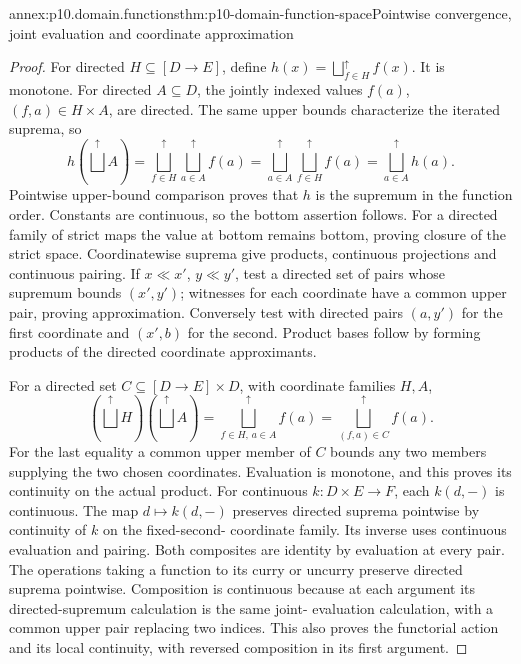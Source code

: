\begin{annexitem}{annex:p10.domain.functions}{thm:p10-domain-function-space}{Pointwise convergence, joint evaluation and coordinate approximation}
\begin{proof}
For directed \(H\subseteq[D\longrightarrow E]\), define
\(h(x)=\bigsqcup^{\uparrow}_{f\in H}f(x)\). It is monotone.
For directed \(A\subseteq D\), the jointly indexed values
\(f(a)\), \((f,a)\in H\times A\), are directed. The same
upper bounds characterize the iterated suprema, so
\[
 h(\bigsqcup^{\uparrow}A)
 =\bigsqcup_{f\in H}^{\uparrow}\bigsqcup_{a\in A}^{\uparrow}f(a)
 =\bigsqcup_{a\in A}^{\uparrow}\bigsqcup_{f\in H}^{\uparrow}f(a)
 =\bigsqcup_{a\in A}^{\uparrow}h(a).
\]
Pointwise upper-bound comparison proves that \(h\) is the supremum
in the function order. Constants are continuous, so the bottom
assertion follows. For a directed family of strict maps the value
at bottom remains bottom, proving closure of the strict space.
Coordinatewise suprema give products, continuous projections and
continuous pairing. If \(x\ll x'\), \(y\ll y'\), test a directed
set of pairs whose supremum bounds \((x',y')\); witnesses for each
coordinate have a common upper pair, proving approximation.
Conversely test with directed pairs \((a,y')\) for the first
coordinate and \((x',b)\) for the second. Product bases follow by
forming products of the directed coordinate approximants.

For a directed set \(C\subseteq[D\longrightarrow E]\times D\),
with coordinate families \(H,A\),
\[
 (\bigsqcup^{\uparrow}H)(\bigsqcup^{\uparrow}A)
          =\bigsqcup_{f\in H,\,a\in A}^{\uparrow} f(a)
          =\bigsqcup_{(f,a)\in C}^{\uparrow} f(a).
\]
For the last equality a common upper member of \(C\) bounds any
two members supplying the two chosen coordinates. Evaluation is
monotone, and this proves its continuity on the actual product.
For continuous \(k:D\times E\to F\), each \(k(d,-)\) is
continuous. The map \(d\mapsto k(d,-)\) preserves directed
suprema pointwise by continuity of \(k\) on the fixed-second-
coordinate family. Its inverse uses continuous evaluation and
pairing. Both composites are identity by evaluation at every pair.
The operations taking a function to its curry or uncurry preserve
directed suprema pointwise. Composition is continuous because at
each argument its directed-supremum calculation is the same joint-
evaluation calculation, with a common upper pair replacing two
indices. This also proves the functorial action and its local
continuity, with reversed composition in its first argument.
\end{proof}
\end{annexitem}

